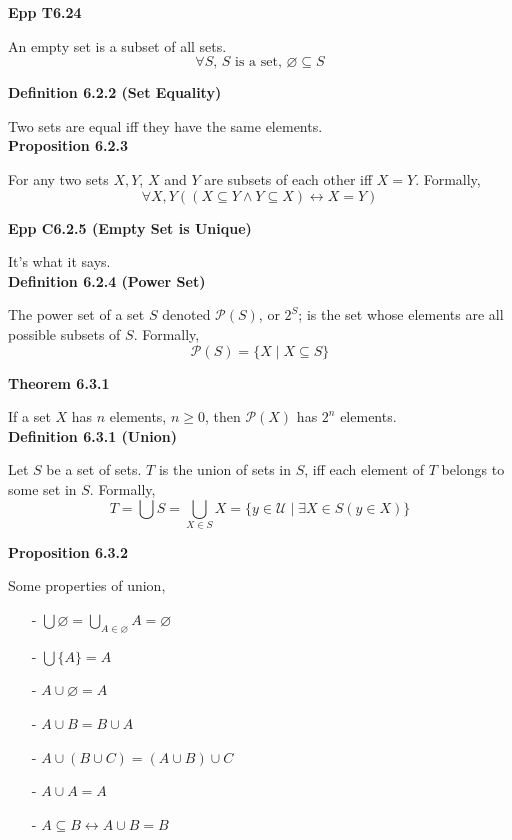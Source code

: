 \documentclass[a4paper]{article}
\newcommand{\subheading}[1]{{\scriptsize\textbf{#1}}}
\begin{document}
\begin{multicols*}{4}
\subheading{Epp T6.24}

An empty set is a subset of all sets.
$$\forall S\text{, $S$ is a set, }\varnothing \subseteq S$$

\subheading{Definition 6.2.2 (Set Equality)}

Two sets are equal iff they have the same elements.\\

\subheading{Proposition 6.2.3}

For any two sets $X, Y$, $X$ and $Y$ are subsets of each other iff $X = Y$.
Formally,
$$\forall X, Y((X \subseteq Y \land Y \subseteq X) \longleftrightarrow X=Y)$$

\subheading{Epp C6.2.5 (Empty Set is Unique)}

It's what it says.\\

\subheading{Definition 6.2.4 (Power Set)}

The power set of a set $S$ denoted $\mathcal{P}(S)$, or $2^S$; is the set whose
elements are all possible subsets of $S$. Formally,
$$\mathcal{P}(S) = \{X\;|\;X\subseteq S\}$$

\subheading{Theorem 6.3.1}

If a set $X$ has $n$ elements, $n \geq 0$, then $\mathcal{P}(X)$ has $2^n$
elements. \\

\subheading{Definition 6.3.1 (Union)}

Let $S$ be a set of sets. $T$ is the union of sets in $S$, iff each element of
$T$ belongs to some set in $S$. Formally,
$$T=\bigcup S = \bigcup_{X\in S} X = \{ y \in \mathcal{U}\;|\;\exists X \in S (y
\in X)\}$$

\subheading{Proposition 6.3.2}

Some properties of union,
\begin{itemize}[leftmargin=*] \itemsep -0.3em
  \item[-] $\bigcup \varnothing = \bigcup_{A \in \varnothing} A = \varnothing$
  \item[-] $\bigcup \{A\} = A$
  \item[-] $A \cup \varnothing = A$
  \item[-] $A \cup B = B \cup A$
  \item[-] $A \cup (B \cup C) = (A \cup B) \cup C$
  \item[-] $A \cup A = A$
  \item[-] $A \subseteq B \longleftrightarrow A \cup B = B$
\end{itemize}


\end{multicols*}
\end{document}
